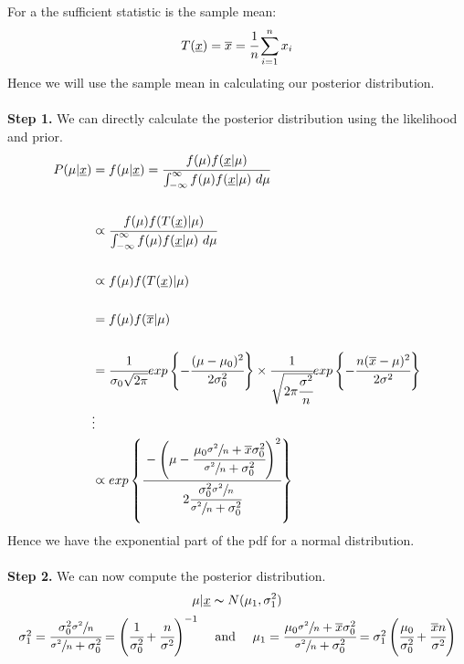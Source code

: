 \documentclass{report}
\begin{document}
                For a  the sufficient statistic is the sample mean:
                \[T(\underline{x}) = \overline{x} = \cfrac{1}{n}\sum_{i=1}^n x_i\]
                Hence we will use the sample mean in calculating our posterior distribution.
                \\
                \\ \textbf{Step 1.} We can directly calculate the posterior distribution using the likelihood and prior.
                \[\begin{split}
                    P(\mu|\underline{x}) &= f(\mu|\underline{x}) = \cfrac{f(\mu)f(\underline{x}|\mu)}{\int_{-\infty}^\infty f(\mu)f(\underline{x}|\mu) \ d \mu} \\
                    \\
                    &\varpropto  \cfrac{f(\mu)f(T(\underline{x})|\mu)}{\int_{-\infty}^\infty f(\mu)f(\underline{x}|\mu) \ d \mu} \\
                    \\
                    &\varpropto f(\mu)f(T(\underline{x})| \mu) \\
                    \\
                    &= f(\mu)f(\overline{x}| \mu) \\
                    \\
                    &= \cfrac{1}{\sigma_0 \sqrt{2 \pi}} exp \left\{ -\cfrac{(\mu - \mu_0)^2}{2 \sigma^2_0} \right\} \times \cfrac{1}{\sqrt{2 \pi \cfrac{\sigma^2}{n}}} exp \left\{ -\cfrac{n(\overline{x} - \mu)^2}{2 \sigma^2} \right\} \\
                    & \vdots \\
                    &\varpropto exp \left\{ \cfrac{-\left( \mu - \cfrac{\mu_0\sfrac{\sigma^2}{n} + \overline{x}\sigma^2_0}{\sfrac{\sigma^2}{n} + \sigma^2_0} \right)^2}{2 \cfrac{\sigma^2_0\sfrac{\sigma^2}{n}}{\sfrac{\sigma^2}{n} + \sigma_0^2}} \right\}
                \end{split}\]
                Hence we have the exponential part of the pdf for a normal distribution.
                \\
                \\ \textbf{Step 2.} We can now compute the posterior distribution.
                \[\mu|\underline{x} \thicksim N(\mu_1, \sigma_1^2)\]
                \[\begin{matrix}
                    \sigma_1^2 = \cfrac{\sigma_0^2\sfrac{\sigma^2}{n}}{\sfrac{\sigma^2}{n} + \sigma_0^2} = \left( \cfrac{1}{\sigma^2_0} + \cfrac{n}{\sigma^2} \right)^{-1} & \text{  and  } & \mu_1 = \cfrac{\mu_0 \sfrac{\sigma^2}{n} + \overline{x}\sigma_0^2}{\sfrac{\sigma^2}{n} + \sigma^2_0} = \sigma_1^2 \left( \cfrac{\mu_0}{\sigma_0^2} + \cfrac{\overline{x}n}{\sigma^2} \right)
                \end{matrix}\]
\end{document}
